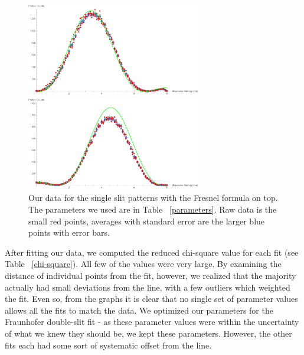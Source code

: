 \documentclass[prb,preprint]{revtex4-1}
\begin{document}
\begin{figure}[h!]
\centering
\begin{minipage}[b]{0.45\linewidth}
	\includegraphics[width=3in]{far_slit_Fresnel_plot.pdf}
\end{minipage}
\quad
\begin{minipage}[b]{0.45\linewidth}
	\includegraphics[width=3in]{near_slit_Fresnel_plot.pdf}
\end{minipage}
\caption{Our data for the single slit patterns with the Fresnel formula on top. The parameters we used are in Table ~\ref{parameters}. Raw data is the small red points, averages with standard error are the larger blue points with error bars. }
\label{single_slits_Fresnel_plot}
\end{figure} 

After fitting our data, we computed the reduced chi-square value for each fit (see Table ~\ref{chi-square}).  All few of the values were very large.  By examining the distance of individual points from the fit, however, we realized that the majority actually had small deviations from the line, with a few outliers which weighted the fit.  Even so, from the graphs it is clear that no single set of parameter values allows all the fits to match the data.  We optimized our parameters for the Fraunhofer double-slit fit - as these parameter values were within the uncertainty of what we knew they should be, we kept these parameters.  However, the other fits each had some sort of systematic offset from the line.  
\end{document}
